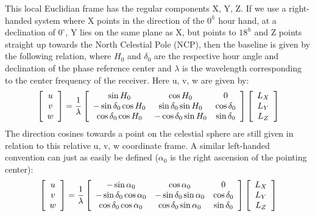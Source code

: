 This local Euclidian frame has the regular components X, Y, Z. If we use a right-handed system where X points in the direction 
of the $0^h$ hour hand, at a declination of $0^{\circ}$, Y lies on the same plane as X, but points to $18^h$ and Z points straight up 
towards the North Celestial Pole (NCP), then the baseline is given by the following relation, where $H_0$ and $\delta_0$ are the 
respective hour angle and declination of the phase reference center and $\lambda$ is the wavelength corresponding to the center 
frequency of the receiver. Here u, v, w are given by:
\begin{equation}
 \label{EQN_RIGHTHANDED_SYSTEM}
 \left[\begin{array}{c}
     u\\
     v \\
     w \\
    \end{array}\right] = \frac{1}{\lambda}
 \left[\begin{array}{c c c}
     \sin{H_0} 			& \cos{H_0}			& 0 \\
     -\sin{\delta_0}\cos{H_0} 	& \sin{\delta_0}\sin{H_0}	& \cos{\delta_0}\\
     \cos{\delta_0}\cos{H_0} 	& -\cos{\delta_0}\sin{H_0}	& \sin{\delta_0}\\
    \end{array}\right]   
 \left[\begin{array}{c}
     L_X \\
     L_Y \\
     L_Z \\
    \end{array}\right]
\end{equation}
The direction cosines towards a point on the celestial sphere are still given in relation to this relative u, v, w coordinate frame.
A similar left-handed convention can just as easily be defined ($\alpha_0$ is the right ascension of the pointing center):
\begin{equation}
 \label{EQN_LEFTHANDED_SYSTEM}
 \left[\begin{array}{c}
     u\\
     v \\
     w \\
    \end{array}\right] = \frac{1}{\lambda}
 \left[\begin{array}{c c c}
     -\sin{\alpha_0} 			& \cos{\alpha_0}		& 0 \\
     -\sin{\delta_0}\cos{\alpha_0} 	& -\sin{\delta_0}\sin{\alpha_0}	& \cos{\delta_0}\\
     \cos{\delta_0}\cos{\alpha_0} 	& \cos{\delta_0}\sin{\alpha_0}	& \sin{\delta_0}\\
    \end{array}\right]   
 \left[\begin{array}{c}
     L_X \\
     L_Y \\
     L_Z \\
    \end{array}\right]
\end{equation}

